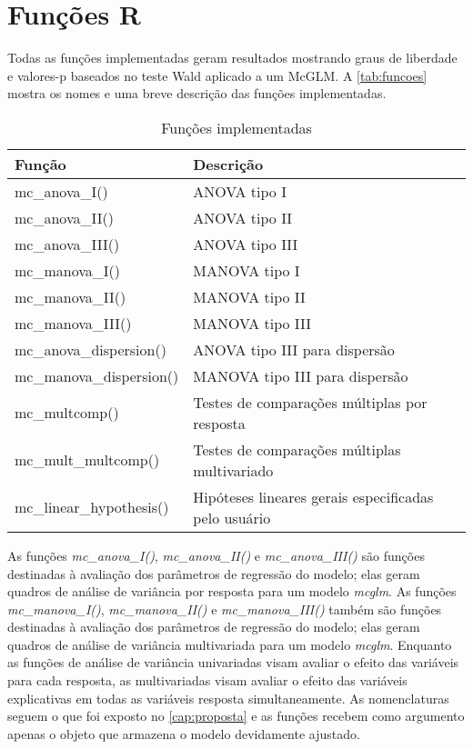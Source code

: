 
\section{Funções R}

Todas as funções implementadas geram resultados mostrando graus de liberdade e valores-p baseados no teste Wald aplicado a um McGLM. A \autoref{tab:funcoes} mostra os nomes e uma breve descrição das funções implementadas.

\begin{table}[h]
\centering
\begin{tabular}{ll}
\hline
Função                   & Descrição \\ 
\hline

mc\_anova\_I()           & ANOVA  tipo I \\
mc\_anova\_II()          & ANOVA  tipo II \\
mc\_anova\_III()         & ANOVA  tipo III \\

mc\_manova\_I()          & MANOVA tipo I \\
mc\_manova\_II()         & MANOVA tipo II \\
mc\_manova\_III()        & MANOVA tipo III \\

mc\_anova\_dispersion()        & ANOVA  tipo III para dispersão \\
mc\_manova\_dispersion()       & MANOVA tipo III para dispersão \\

mc\_multcomp()           & Testes de comparações múltiplas por resposta \\

mc\_mult\_multcomp()     & Testes de comparações múltiplas multivariado \\

mc\_linear\_hypothesis() & Hipóteses lineares gerais especificadas pelo usuário \\

\hline
\end{tabular}
\caption{Funções implementadas}
\label{tab:funcoes}
\end{table}

As funções \emph{mc\_anova\_I()}, \emph{mc\_anova\_II()} e \emph{mc\_anova\_III()} são funções destinadas à avaliação dos parâmetros de regressão do modelo; elas geram quadros de análise de variância por resposta para um modelo \emph{mcglm}. As funções \emph{mc\_manova\_I()}, \emph{mc\_manova\_II()} e \emph{mc\_manova\_III()} também são funções destinadas à avaliação dos parâmetros de regressão do modelo; elas geram quadros de análise de variância multivariada para um modelo \emph{mcglm}. Enquanto as funções de análise de variância univariadas visam avaliar o efeito das variáveis para cada resposta, as multivariadas visam avaliar o efeito das variáveis explicativas em todas as variáveis resposta simultaneamente. As nomenclaturas seguem o que foi exposto no \autoref{cap:proposta} e as funções recebem como argumento apenas o objeto que armazena o modelo devidamente ajustado.

